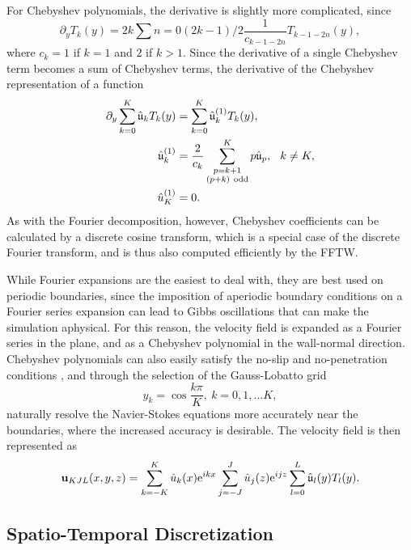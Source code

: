 For Chebyshev polynomials, the derivative is slightly more complicated, since 
\begin{equation}
\partial_y T_k(y) = 2k\sum{n=0}{(2k-1)/2}{\frac{1}{c_{k-1-2n}} T_{k-1-2n}(y)},
\end{equation}
where $c_k = 1$ if $k=1$ and $2$ if $k > 1$. Since the derivative of a single Chebyshev term becomes a sum of Chebyshev terms, the derivative of the Chebyshev representation of a function 
\begin{align}
\partial_y \sum{k=0}{K}\hat{\mathfrak{u}}_kT_k(y) &= \sum{k=0}{K}\hat{\mathfrak{u}}_k^{(1)}T_k(y),\\
\hat{\mathfrak{u}}_k^{(1)} &= \frac{2}{c_k}\sum{\substack{p = k+1\\(p+k) \mathrm{~odd}}}{K} p \hat{\mathfrak{u}}_p, \hspace{0.25cm} k \neq K,\\
\hat{u}^{(1)}_K &= 0.
\end{align}
As with the Fourier decomposition, however, Chebyshev coefficients can be calculated by a discrete cosine transform, which is a special case of the discrete Fourier transform, and is thus also computed efficiently by the FFTW. 

While Fourier expansions are the easiest to deal with, they are best used on periodic boundaries, since the imposition of aperiodic boundary conditions on a Fourier series expansion can lead to Gibbs oscillations that can make the simulation aphysical. For this reason, the velocity field is expanded as a Fourier series in the plane, and as a Chebyshev polynomial in the wall-normal direction. Chebyshev polynomials can also easily satisfy the no-slip and no-penetration conditions , and through the selection of the Gauss-Lobatto grid
\begin{equation}
y_{k} = \cos{\dfrac{k\pi}{K}},~k = 0,1,...K,
\end{equation}
naturally resolve the Navier-Stokes equations more accurately near the boundaries, where the increased accuracy is desirable. The velocity field is then represented as 
\begin{equation}
\Vector{u}_{KJL}(x,y,z) = \sum{k=-K}{K}{\hat{u}_k(x)\exp{ikx}}\sum{j=-J}{J}{\hat{u}_j(z)\exp{ijz}}\sum{l=0}{L}{\hat{\mathfrak{u}}_l(y)T_l(y)}.
\end{equation}

\subsection{Spatio-Temporal Discretization} 

